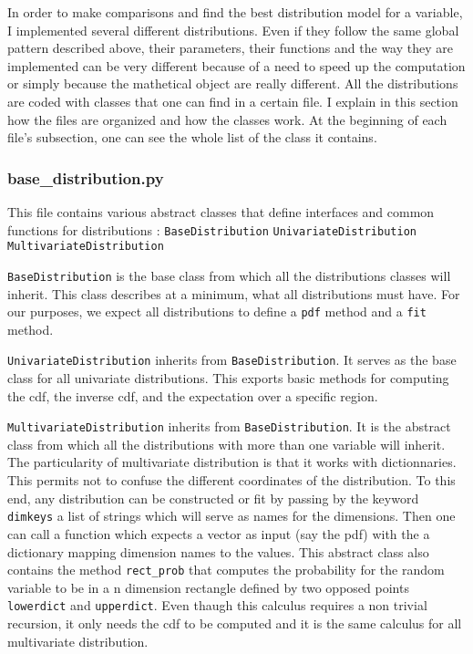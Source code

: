 \documentclass{article}
\begin{document}
	 In order to make comparisons and find the best distribution model for a variable, I implemented several different distributions. Even if they follow the same global pattern described above, their parameters, their functions and the way they are implemented can be very different because of a need to speed up the computation or simply because the mathetical object are really different. All the distributions are coded with classes that one can find in a certain file. I explain in this section how the files are organized and how the classes work. At the beginning of each file's subsection, one can see the whole list of the class it contains.


	 \subsubsection{base\_distribution.py}
	 This file contains various abstract classes that define interfaces and common functions for distributions :\newline
	 \newline
	 \texttt{BaseDistribution} \newline
	 \texttt{UnivariateDistribution} \newline
	 \texttt{MultivariateDistribution} \newline

	 \texttt{BaseDistribution} is the base class from which all the distributions classes will inherit. This class describes at a minimum, what all distributions must have.
	 For our purposes, we expect all distributions to define a \texttt{pdf} method and a \texttt{fit} method.\newline

	 \texttt{UnivariateDistribution} inherits from \texttt{BaseDistribution}. It serves as the base class for all univariate distributions.
	 This exports basic methods for computing the cdf, the inverse cdf, and the expectation over a specific region.

	 \texttt{MultivariateDistribution} inherits from \texttt{BaseDistribution}. It is the abstract class from which all the distributions with more than one variable will inherit. The particularity of multivariate distribution is that it works with dictionnaries. This permits not to confuse the different coordinates of the distribution. To this end, any distribution can be constructed or fit by passing by the keyword \texttt{dimkeys} a list of strings which will serve as names for the dimensions. Then one can call a function which expects a vector as input (say the pdf) with the a dictionary mapping dimension names to the values. This abstract class also contains the method \texttt{rect\_prob} that computes the probability for the random variable to be in a n dimension rectangle defined by two opposed points \texttt{lowerdict} and \texttt{upperdict}. Even thaugh this calculus requires a non trivial recursion, it only needs the cdf to be computed and it is the same calculus for all multivariate distribution.
\end{document}
